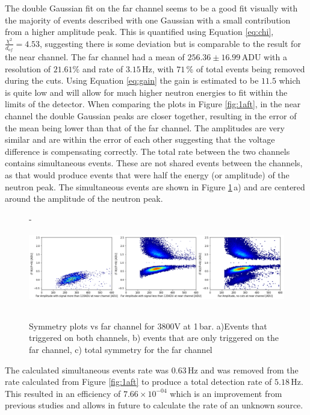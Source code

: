 \documentclass[a4paper]{article}
\begin{document}
\newline The double Gaussian fit on the far channel seems to be a good fit visually with the majority of events described with one Gaussian with a small contribution from a higher amplitude peak. This is quantified using Equation \ref{eq:chi}, $\frac{\chi^2}{d_{of}} = 4.53$, suggesting there is some deviation but is comparable to the result for the near channel.
The far channel had a mean of $256.36 \pm 16.99$\,ADU with a resolution of $21.61\%$ and rate of $3.15$\,Hz, with $71$\,\% of total events being removed during the cuts. Using Equation \ref{eq:gain} the gain is estimated to be $11.5$ which is quite low and will allow for much higher neutron energies to fit within the limits of the detector.
\newline When comparing the plots in Figure \ref{fig:1aft}, in the near channel the double Gaussian peaks are closer together, resulting in the error of the mean being lower than that of the far channel. The amplitudes are very similar and are within the error of each other suggesting that the voltage difference is compensating correctly.
\newline The total rate between the two channels contains simultaneous events. These are not shared events  between the channels, as that would produce events that were half the energy (or amplitude) of the neutron peak. The simultaneous events are shown in Figure \ref{fig:1sym}\,a) and are centered around the amplitude of the neutron peak.
\begin{figure}[H]- 
    \centering
    \includegraphics[height=3.7cm]{uk24n001_symgood.png}
    \caption{Symmetry plots vs far channel for 3800V at 1\,bar. a)Events that triggered on both channels, b) events that are only triggered on the far channel, c) total symmetry for the far channel}
    \label{fig:1sym}
\end{figure}
\noindent The calculated simultaneous events rate was $0.63$\,Hz and was removed from the rate calculated from Figure \ref{fig:1aft} to produce a total detection rate of $5.18$\,Hz. This resulted in an efficiency of $7.66\times10^{-04}$ which is an improvement from previous studies and allows in future to calculate the rate of an unknown source.
\end{document}
